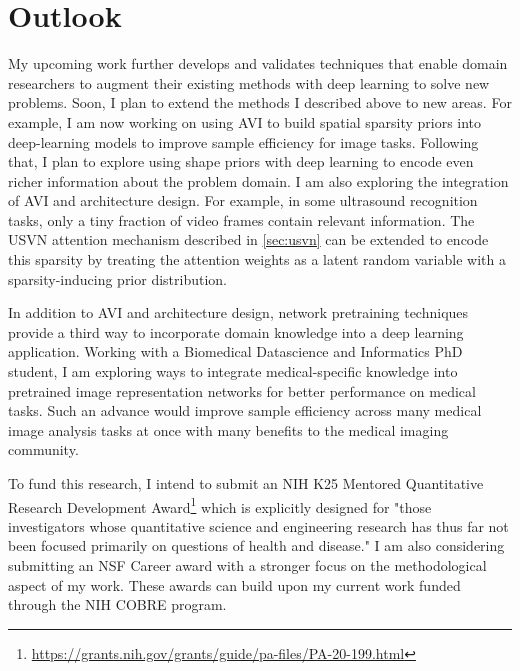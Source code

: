 \documentclass{tufte-handout}
\begin{document}
\section{Outlook}
My upcoming work further develops and validates techniques that enable domain researchers to augment their existing methods with deep learning to solve new problems. Soon, I plan to extend the methods I described above to new areas. For example, I am now working on using AVI to build spatial sparsity priors into deep-learning models to improve sample efficiency for image tasks. Following that, I plan to explore using shape priors with deep learning to encode even richer information about the problem domain. I am also exploring the integration of AVI and architecture design. For example, in some ultrasound recognition tasks, only a tiny fraction of video frames contain relevant information. The USVN attention mechanism described in \ref{sec:usvn} can be extended to encode this sparsity by treating the attention weights as a latent random variable with a sparsity-inducing prior distribution.

In addition to AVI and architecture design, network pretraining techniques provide a third way to incorporate domain knowledge into a deep learning application. Working with a Biomedical Datascience and Informatics PhD student, I am exploring ways to integrate medical-specific knowledge into pretrained image representation networks for better performance on medical tasks. Such an advance would improve sample efficiency across many medical image analysis tasks at once with many benefits to the medical imaging community.

To fund this research, I intend to submit an NIH K25 Mentored Quantitative Research Development Award\thanks{\url{https://grants.nih.gov/grants/guide/pa-files/PA-20-199.html}} which is explicitly designed for "those investigators whose quantitative science and engineering research has thus far not been focused primarily on questions of health and disease." I am also considering submitting an NSF Career award with a stronger focus on the methodological aspect of my work. These awards can build upon my current work funded through the NIH COBRE program.




\end{document}
